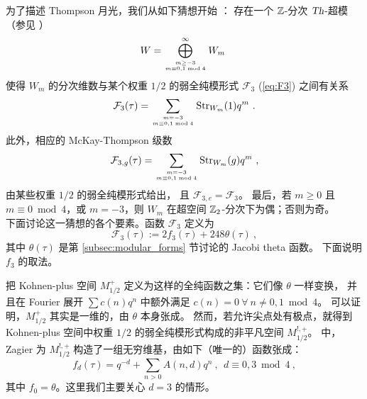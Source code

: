 
为了描述 Thompson 月光，我们从如下猜想开始 \cite{Harvey:2015mca}：
{\conj \label{conj:thompson} 存在一个 $\mathbb{Z}$-分次 $\operatorname{\textsl{Th}}$-超模（参见 ）
\begin{equation}
W=\bigoplus_{m\geq-3\atop m\equiv0,1\bmod4}^\infty W_m~
\end{equation}
使得 $W_m$ 的分次维数与某个权重 $1/2$ 的弱全纯模形式 $\mathcal{F}_3$ (\ref{eq:F3}) 之间有关系
\begin{equation}
\mathcal{F}_3(\tau)=\sum_{m=-3\atop m\equiv0,1\bmod4}{\operatorname{Str}}_{W_m}(1)q^m~.
\end{equation}
此外，相应的 McKay-Thompson 级数
\begin{equation}
\mathcal{F}_{3,g}(\tau)=\sum_{m=-3\atop m\equiv0,1\bmod4}{\operatorname{Str}}_{W_m}(g)q^m~,
\end{equation}
由某些权重 $1/2$ 的弱全纯模形式给出，
且 $\mathcal{F}_{3,e}=\mathcal{F}_3$。
最后，若 $m\geq0$ 且 $m\equiv0\bmod4$，或 $m=-3$，则 $W_m$ 在超空间 $\mathbb{Z}_2$-分次下为偶；否则为奇。
}\\

\noindent 下面讨论这一猜想的各个要素。函数 $\mathcal{F}_3$ 定义为
\begin{equation}
\label{eq:F3}
\mathcal{F}_3(\tau):=2f_3(\tau)+248\theta(\tau)~,
\end{equation}
其中 $\theta(\tau)$ 是第 \ref{subsec:modular_forms} 节讨论的 Jacobi theta 函数。
下面说明 $f_3$ 的取法。

把 Kohnen-plus 空间 $M_{1/2}^+$ 定义为这样的全纯函数之集：它们像 $\theta$ 一样变换，
并且在 Fourier 展开 $\sum c(n)q^n$ 中额外满足 $c(n)=0~\forall~n\neq0,1\bmod4$。
可以证明，$M_{1/2}^+$ 其实是一维的，由 $\theta$ 本身张成。
然而，若允许尖点处有极点，就得到 Kohnen-plus 空间中权重 $1/2$ 的弱全纯模形式构成的非平凡空间 $M_{1/2}^{!,+}$。
\cite{Zag_TrcSngMdl} 中，Zagier 为 $M_{1/2}^{!,+}$ 构造了一组无穷维基，由如下（唯一的）函数张成：
\begin{equation}
f_d(\tau)=q^{-d}+\sum_{n>0}A(n,d)q^n~,~~d\equiv0,3\bmod4~,
\end{equation}
其中 $f_0=\theta$。这里我们主要关心 $d=3$ 的情形。


